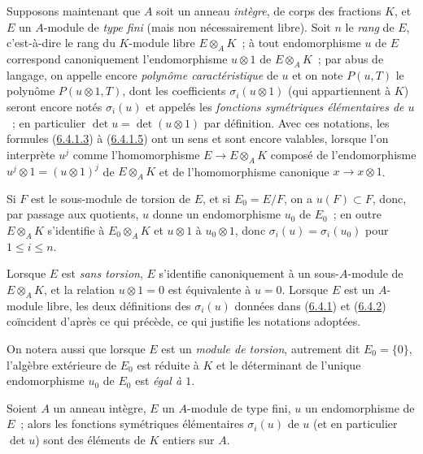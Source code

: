 \begin{env}[6.4.2]
\label{II.6.4.2-fr}
Supposons maintenant que $A$ soit un anneau \emph{intègre}, de corps des
fractions $K$, et $E$ un $A$-module de \emph{type fini} (mais non
nécessairement libre). Soit $n$ le \emph{rang} de $E$, c'est-à-dire le rang du
$K$-module libre $E\otimes_AK$~; à tout endomorphisme $u$ de $E$ correspond
canoniquement l'endomorphisme $u\otimes1$ de $E\otimes_AK$~; par abus de
langage, on appelle encore \emph{polynôme caractéristique} de $u$ et on note
$P(u,T)$ le polynôme $P(u\otimes1,T)$, dont les coefficients
$\sigma_i(u\otimes1)$ (qui appartiennent à $K$) seront encore notés
$\sigma_i(u)$ et appelés les \emph{fonctions symétriques élémentaires de
$u$}~; en particulier $\det u=\det(u\otimes1)$ par définition. Avec ces
notations, les formules (\hyperref[II.6.4.1.3-fr]{6.4.1.3}) à
(\hyperref[II.6.4.1.5-fr]{6.4.1.5}) ont un sens et sont encore valables,
lorsque l'on interprète $u^j$ comme l'homomorphisme $E\to E\otimes_AK$
composé de l'endomorphisme $u^j\otimes1=(u\otimes1)^j$ de $E\otimes_AK$ et
de l'homomorphisme canonique $x\to x\otimes1$.

Si $F$ est le sous-module de torsion de $E$, et si $E_0=E/F$, on a
$u(F)\subset F$, donc, par passage aux quotients, $u$ donne un endomorphisme
$u_0$ de $E_0$~; en outre $E\otimes_AK$ s'identifie à $E_0\otimes_AK$ et
$u\otimes1$ à $u_0\otimes1$, donc $\sigma_i(u)=\sigma_i(u_0)$ pour
$1\leq i\leq n$.

Lorsque $E$ est \emph{sans torsion}, $E$ s'identifie canoniquement à un
sous-$A$-module de $E\otimes_AK$, et la relation $u\otimes1=0$ est
équivalente à $u=0$. Lorsque $E$ est un $A$-module libre, les deux définitions
des $\sigma_i(u)$ données dans (\hyperref[II.6.4.1-fr]{6.4.1}) et
(\hyperref[II.6.4.2-fr]{6.4.2}) coïncident d'après ce qui précède, ce qui
justifie les notations adoptées.

On notera aussi que lorsque $E$ est un \emph{module de torsion}, autrement dit
$E_0=\{0\}$, l'algèbre extérieure de $E_0$ est réduite à $K$ et le déterminant
de l'unique endomorphisme $u_0$ de $E_0$ est \emph{égal à $1$}.
\end{env}

\begin{proposition}[6.4.3]
\label{II.6.4.3-fr}
Soient $A$ un anneau intègre, $E$ un $A$-module de type fini, $u$ un
endomorphisme de $E$~; alors les fonctions symétriques élémentaires
$\sigma_i(u)$ de $u$ (et en particulier $\det u$) sont des éléments de $K$
entiers sur $A$.
\end{proposition}


